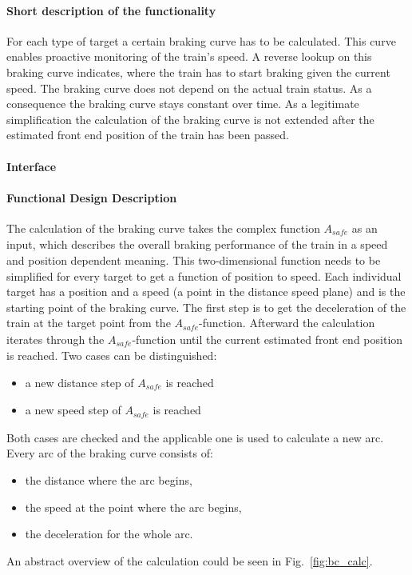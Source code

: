 \paragraph{Short description of the functionality}
For each type of target a certain braking curve has to be calculated. This curve enables proactive monitoring of the train's speed. A reverse lookup on this braking curve indicates, where the train has to start braking given the current speed. The braking curve does not depend on the actual train status. As a consequence the braking curve stays constant over time. As a legitimate simplification the calculation of the braking curve is not extended after the estimated front end position of the train has been passed.

\paragraph{Interface}

\paragraph{Functional Design Description}
The calculation of the braking curve takes the complex function $A_{\mathit{safe}}$ as an input, which describes the overall braking performance of the train in a speed and position dependent meaning. This two-dimensional function needs to be simplified for every target to get a function of position to speed. Each individual target has a position and a speed (a point in the distance speed plane) and is the starting point of the braking curve. The first step is to get the deceleration of the train at the target point from the $A_{\mathit{safe}}$-function. Afterward the calculation iterates through the $A_{\mathit{safe}}$-function until the current estimated front end position is reached. Two cases can be distinguished:
\begin{itemize}
\item a new distance step of $A_{\mathit{safe}}$ is reached
\item a new speed step of $A_{\mathit{safe}}$ is reached
\end{itemize}

Both cases are checked and the applicable one is used to calculate a new arc. Every arc of the braking curve consists of:
\begin{itemize}
\item the distance where the arc begins,
\item the speed at the point where the arc begins,
\item the deceleration for the whole arc.
\end{itemize}
An abstract overview of the calculation could be seen in Fig.~\ref{fig:bc_calc}.


